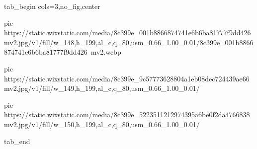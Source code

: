  
 
 
 
 


\ifcmt
  tab_begin cols=3,no_fig,center

     pic https://static.wixstatic.com/media/8c399e_001b8866874741e6b6ba81777f9dd426~mv2.jpg/v1/fill/w_148,h_199,al_c,q_80,usm_0.66_1.00_0.01/8c399e_001b8866874741e6b6ba81777f9dd426~mv2.webp

		 pic https://static.wixstatic.com/media/8c399e_9c57773628804a1eb08dec724439ae66~mv2.jpg/v1/fill/w_149,h_199,al_c,q_80,usm_0.66_1.00_0.01/%

		 pic https://static.wixstatic.com/media/8c399e_5223511212974395a6be0f2da4766838~mv2.jpg/v1/fill/w_150,h_199,al_c,q_80,usm_0.66_1.00_0.01/%

  tab_end
\fi
